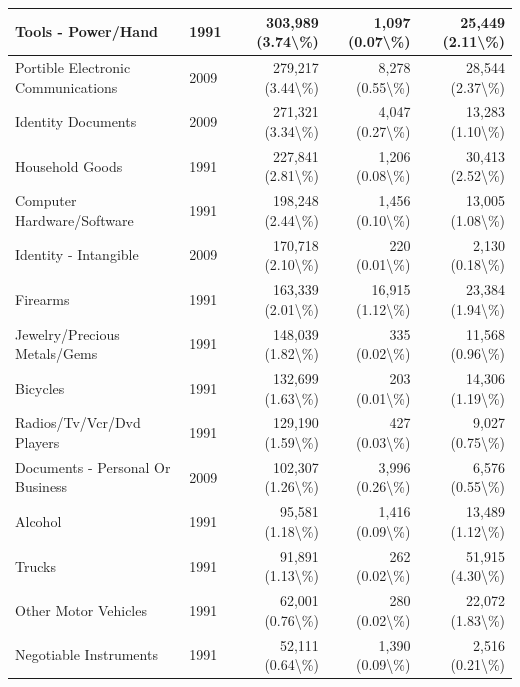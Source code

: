 \documentclass[
]{krantz}
\begin{document}
\begin{longtable}[t]{l|l|r|r|r}
\hline
Tools - Power/Hand & 1991 & 303,989 (3.74\textbackslash{}\%) & 1,097 (0.07\textbackslash{}\%) & 25,449 (2.11\textbackslash{}\%)\\
\hline
Portible Electronic Communications & 2009 & 279,217 (3.44\textbackslash{}\%) & 8,278 (0.55\textbackslash{}\%) & 28,544 (2.37\textbackslash{}\%)\\
\hline
Identity Documents & 2009 & 271,321 (3.34\textbackslash{}\%) & 4,047 (0.27\textbackslash{}\%) & 13,283 (1.10\textbackslash{}\%)\\
\hline
Household Goods & 1991 & 227,841 (2.81\textbackslash{}\%) & 1,206 (0.08\textbackslash{}\%) & 30,413 (2.52\textbackslash{}\%)\\
\hline
Computer Hardware/Software & 1991 & 198,248 (2.44\textbackslash{}\%) & 1,456 (0.10\textbackslash{}\%) & 13,005 (1.08\textbackslash{}\%)\\
\hline
Identity - Intangible & 2009 & 170,718 (2.10\textbackslash{}\%) & 220 (0.01\textbackslash{}\%) & 2,130 (0.18\textbackslash{}\%)\\
\hline
Firearms & 1991 & 163,339 (2.01\textbackslash{}\%) & 16,915 (1.12\textbackslash{}\%) & 23,384 (1.94\textbackslash{}\%)\\
\hline
Jewelry/Precious Metals/Gems & 1991 & 148,039 (1.82\textbackslash{}\%) & 335 (0.02\textbackslash{}\%) & 11,568 (0.96\textbackslash{}\%)\\
\hline
Bicycles & 1991 & 132,699 (1.63\textbackslash{}\%) & 203 (0.01\textbackslash{}\%) & 14,306 (1.19\textbackslash{}\%)\\
\hline
Radios/Tv/Vcr/Dvd Players & 1991 & 129,190 (1.59\textbackslash{}\%) & 427 (0.03\textbackslash{}\%) & 9,027 (0.75\textbackslash{}\%)\\
\hline
Documents - Personal Or Business & 2009 & 102,307 (1.26\textbackslash{}\%) & 3,996 (0.26\textbackslash{}\%) & 6,576 (0.55\textbackslash{}\%)\\
\hline
Alcohol & 1991 & 95,581 (1.18\textbackslash{}\%) & 1,416 (0.09\textbackslash{}\%) & 13,489 (1.12\textbackslash{}\%)\\
\hline
Trucks & 1991 & 91,891 (1.13\textbackslash{}\%) & 262 (0.02\textbackslash{}\%) & 51,915 (4.30\textbackslash{}\%)\\
\hline
Other Motor Vehicles & 1991 & 62,001 (0.76\textbackslash{}\%) & 280 (0.02\textbackslash{}\%) & 22,072 (1.83\textbackslash{}\%)\\
\hline
Negotiable Instruments & 1991 & 52,111 (0.64\textbackslash{}\%) & 1,390 (0.09\textbackslash{}\%) & 2,516 (0.21\textbackslash{}\%)\\

\end{longtable}
\end{document}
